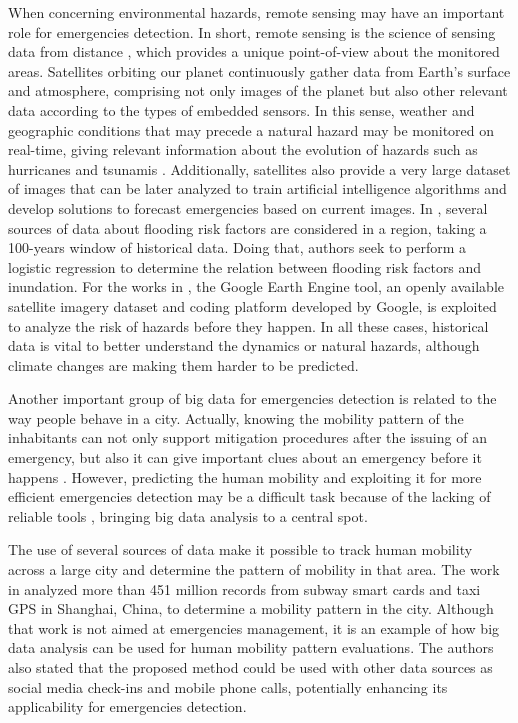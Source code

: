\begin{refsection}
When concerning environmental hazards, remote sensing may have an important role for emergencies detection. In short, remote sensing is the science of sensing data from distance \cite{bigdata1}, which provides a unique point-of-view about the monitored areas. Satellites orbiting our planet continuously gather data from Earth's surface and atmosphere, comprising not only images of the planet but also other relevant data according to the types of embedded sensors. In this sense, weather and geographic conditions that may precede a natural hazard may be monitored on real-time, giving relevant information about the evolution of hazards such as hurricanes and tsunamis \cite{satellite2}. Additionally, satellites also provide a very large dataset of images that can be later analyzed to train artificial intelligence algorithms and develop solutions to forecast emergencies based on current images. In \cite{bigdata2}, several sources of data about flooding risk factors are considered in a region, taking a 100-years window of historical data. Doing that, authors seek to perform a logistic regression to determine the relation between flooding risk factors and inundation. For the works in \cite{satellite3,satellite4}, the Google Earth Engine tool, an openly available satellite imagery dataset and coding platform developed by Google, is exploited to analyze the risk of hazards before they happen. In all these cases, historical data is vital to better understand the dynamics or natural hazards, although climate changes are making them harder to be predicted. 

Another important group of big data for emergencies detection is related to the way people behave in a city. Actually, knowing the mobility pattern of the inhabitants can not only support mitigation procedures after the issuing of an emergency, but also it can give important clues about an emergency before it happens \cite{bigdata1}. However, predicting the human mobility and exploiting it for more efficient emergencies detection may be a difficult task because of the lacking of reliable tools \cite{humanMobility1}, bringing big data analysis to a central spot.

The use of several sources of data make it possible to track human mobility across a large city and determine the pattern of mobility in that area. The work in \cite{bigdata3} analyzed more than 451 million records from subway smart cards and taxi GPS in Shanghai, China, to determine a mobility pattern in the city. Although that work is not aimed at emergencies management, it is an example of how big data analysis can be used for human mobility pattern evaluations. The authors also stated that the proposed method could be used with other data sources as social media check-ins and mobile phone calls, potentially enhancing its applicability for emergencies detection.


\end{refsection}
